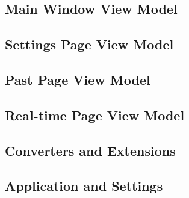 \clearpage
\subsection{Main Window View Model}

\clearpage
\subsection{Settings Page View Model}

\clearpage
\subsection{Past Page View Model}

\clearpage
\subsection{Real-time Page View Model}

\clearpage
\subsection{Converters and Extensions}

\clearpage
\subsection{Application and Settings}